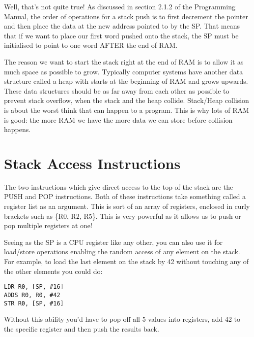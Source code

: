 Well, that's not quite true! As discussed in section 2.1.2 of the Programming Manual, the order of operations for a stack push is to first decrement the pointer and then place the data at the new address pointed to by the SP. That means that if we want to place our first word pushed onto the stack, the SP must be initialised to point to one word AFTER the end of RAM.

The reason we want to start the stack right at the end of RAM is to allow it as much space as possible to grow. Typically computer systems have another data structure called a heap with starts at the beginning of RAM and grows upwards. These data structures should be as far away from each other as possible to prevent stack overflow, when the stack and the heap collide. Stack/Heap collision is about the worst think that can happen to a program. This is why lots of RAM is good: the more RAM we have the more data we can store before collision happens. 

\section{Stack Access Instructions}
The two instructions which give direct access to the top of the stack are the PUSH and POP instructions. Both of these instructions take something called a register list as an argument. This is sort of an array of registers, enclosed in curly brackets such as \{R0, R2, R5\}. This is very powerful as it allows us to push or pop multiple registers at one!

Seeing as the SP is a CPU register like any other, you can also use it for load/store operations enabling the random access of any element on the stack. For example, to load the  last element on the stack by 42 without touching any of the other elements you could do:
\begin{lstlisting}[fontadjust=true,frame=trBL]
LDR R0, [SP, #16]
ADDS R0, R0, #42
STR R0, [SP, #16]
\end{lstlisting}
Without this ability you'd have to pop off all 5 values into registers, add 42 to the specific register and then push the results back.
